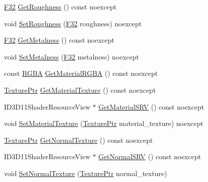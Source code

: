 \begin{DoxyCompactItemize}
\hyperlink{namespacemage_aa97e833b45f06d60a0a9c4fc22ae02c0}{F32} \hyperlink{classmage_1_1rendering_1_1_material_a4c950a1b95e14246027de8ff0da4d55a}{Get\+Roughness} () const noexcept
\item 
void \hyperlink{classmage_1_1rendering_1_1_material_a1504fb6523526ee9897b20851a3b84e9}{Set\+Roughness} (\hyperlink{namespacemage_aa97e833b45f06d60a0a9c4fc22ae02c0}{F32} roughness) noexcept
\item 
\hyperlink{namespacemage_aa97e833b45f06d60a0a9c4fc22ae02c0}{F32} \hyperlink{classmage_1_1rendering_1_1_material_aaa4265533437b462e2f2087cfa37e623}{Get\+Metalness} () const noexcept
\item 
void \hyperlink{classmage_1_1rendering_1_1_material_a46b3297fb948c4fec3447caa35f96918}{Set\+Metalness} (\hyperlink{namespacemage_aa97e833b45f06d60a0a9c4fc22ae02c0}{F32} metalness) noexcept
\item 
const \hyperlink{structmage_1_1_r_g_b_a}{R\+G\+BA} \hyperlink{classmage_1_1rendering_1_1_material_a0464566ef674bf074d0af22e852daaa3}{Get\+Material\+R\+G\+BA} () const noexcept
\item 
\hyperlink{namespacemage_1_1rendering_a6f3ae54f825328465b0cdde0f0de4a36}{Texture\+Ptr} \hyperlink{classmage_1_1rendering_1_1_material_aa396990a630c749a46a8a9fc88e80683}{Get\+Material\+Texture} () const noexcept
\item 
I\+D3\+D11\+Shader\+Resource\+View $\ast$ \hyperlink{classmage_1_1rendering_1_1_material_ae1e1f712801dd1f16a695692df4f4f23}{Get\+Material\+S\+RV} () const noexcept
\item 
void \hyperlink{classmage_1_1rendering_1_1_material_a6bf886a16cbe84c55664701ab3a82658}{Set\+Material\+Texture} (\hyperlink{namespacemage_1_1rendering_a6f3ae54f825328465b0cdde0f0de4a36}{Texture\+Ptr} material\+\_\+texture) noexcept
\item 
\hyperlink{namespacemage_1_1rendering_a6f3ae54f825328465b0cdde0f0de4a36}{Texture\+Ptr} \hyperlink{classmage_1_1rendering_1_1_material_a1ae7786ebd627d3e7ecaf2dc671f497d}{Get\+Normal\+Texture} () const noexcept
\item 
I\+D3\+D11\+Shader\+Resource\+View $\ast$ \hyperlink{classmage_1_1rendering_1_1_material_a8617392cee8e8609671be3f4147a5934}{Get\+Normal\+S\+RV} () const noexcept
\item 
void \hyperlink{classmage_1_1rendering_1_1_material_a1a1ae2ba12c62c1d076f04124f1f64f6}{Set\+Normal\+Texture} (\hyperlink{namespacemage_1_1rendering_a6f3ae54f825328465b0cdde0f0de4a36}{Texture\+Ptr} normal\+\_\+texture)
\end{DoxyCompactItemize}
